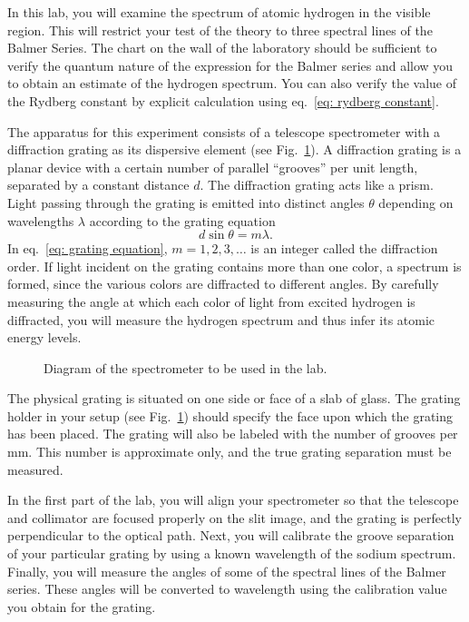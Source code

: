 \documentclass[addpoints]{physlabs}
\begin{document}
\begin{labsection}
\begin{theory}
In this lab, you will examine the spectrum of atomic hydrogen in the visible region. This will restrict your test of the theory to three spectral lines of the Balmer Series. The chart on the wall of the laboratory should be sufficient to verify the quantum nature of the expression for the Balmer series and allow you to obtain an estimate of the hydrogen spectrum. You can also verify the value of the Rydberg constant by explicit calculation using eq.~\ref{eq: rydberg constant}.

The apparatus for this experiment consists of a telescope spectrometer with a diffraction grating as its dispersive element (see Fig.~\ref{fig: spectrometer}). A diffraction grating is a planar device with a certain number of parallel ``grooves'' per unit length, separated by a constant distance $d$. The diffraction grating acts like a prism. Light passing through the grating is emitted into distinct angles $\theta$ depending on wavelengths $\lambda$ according to the grating equation
%
\begin{equation}\label{eq: grating equation}
    d\sin{\theta} = m\lambda.
\end{equation}
%
In eq.~\ref{eq: grating equation}, $m=1,2,3,\ldots$ is an integer called the diffraction order. If light incident on the grating contains more than one color, a spectrum is formed, since the various colors are diffracted to different angles. By carefully measuring the angle at which each color of light from excited hydrogen is diffracted, you will measure the hydrogen spectrum and thus infer its atomic energy levels.

\begin{figure}[ht]
    \centering
    \scalebox{0.85}{}
    \caption{Diagram of the spectrometer to be used in the lab.}
    \label{fig: spectrometer}
\end{figure}

The physical grating is situated on one side or face of a slab of glass. The grating holder in your setup (see Fig.~\ref{fig: spectrometer}) should specify the face upon which the grating has been placed. The grating will also be labeled with the number of grooves per mm. This number is approximate only, and the true grating separation must be measured.

In the first part of the lab, you will align your spectrometer so that the telescope and collimator are focused properly on the slit image, and the grating is perfectly perpendicular to the optical path. Next, you will calibrate the groove separation of your particular grating by using a
known wavelength of the sodium spectrum. Finally, you will measure the angles of some of the spectral lines of the Balmer series. These angles will be converted to wavelength using the calibration value you obtain for the grating.


\end{theory}
\end{labsection}
\end{document}
